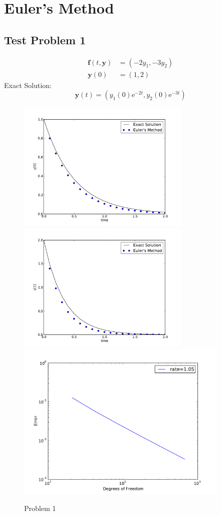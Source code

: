 \documentclass[10pt,letterpaper]{article}
\def\e{\mathrm{e}}
\def\y{\mathbf{y}}
\def\f{\mathbf{f}}
\begin{document}
\section*{Euler's Method}
\subsection*{Test Problem 1}
\begin{align*}
\f(t,\y) &= (-2y_1,-3y_2)\\
\y(0) &= (1, 2)
\end{align*}
Exact Solution:
\[
\y(t)=(y_1(0)\e^{-2t}, y_2(0)\e^{-3t})
\]
\begin{figure}[h!]
\centering
\includegraphics[width=3.25in,keepaspectratio=true]{./p1_1.pdf}
\includegraphics[width=3.25in,keepaspectratio=true]{./p1_2.pdf}
\includegraphics[width=4in,keepaspectratio=true]{./p1_3.pdf}
\caption{Problem 1}
\end{figure}
\end{document}
